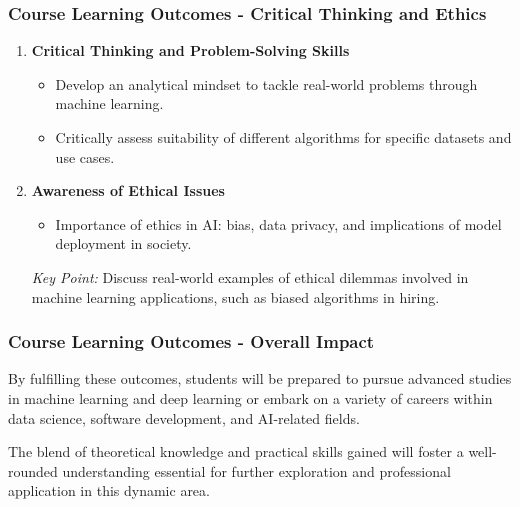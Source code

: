 \documentclass[aspectratio=169]{beamer}
\begin{document}
\begin{frame}[fragile]
    \frametitle{Course Learning Outcomes - Critical Thinking and Ethics}
    \begin{enumerate}
        \item \textbf{Critical Thinking and Problem-Solving Skills}
        \begin{itemize}
            \item Develop an analytical mindset to tackle real-world problems through machine learning.
            \item Critically assess suitability of different algorithms for specific datasets and use cases.
        \end{itemize}

        \item \textbf{Awareness of Ethical Issues}
        \begin{itemize}
            \item Importance of ethics in AI: bias, data privacy, and implications of model deployment in society.
        \end{itemize}
        \textit{Key Point:} Discuss real-world examples of ethical dilemmas involved in machine learning applications, such as biased algorithms in hiring.
    \end{enumerate}
\end{frame}

\begin{frame}[fragile]
    \frametitle{Course Learning Outcomes - Overall Impact}
    By fulfilling these outcomes, students will be prepared to pursue advanced studies in machine learning and deep learning or embark on a variety of careers within data science, software development, and AI-related fields. 

    The blend of theoretical knowledge and practical skills gained will foster a well-rounded understanding essential for further exploration and professional application in this dynamic area.
\end{frame}
\end{document}
